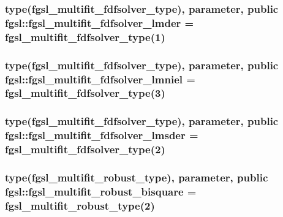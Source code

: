 \subsubsection[{fgsl\+\_\+multifit\+\_\+fdfsolver\+\_\+lmder}]{\setlength{\rightskip}{0pt plus 5cm}type({\bf fgsl\+\_\+multifit\+\_\+fdfsolver\+\_\+type}), parameter, public fgsl\+::fgsl\+\_\+multifit\+\_\+fdfsolver\+\_\+lmder = {\bf fgsl\+\_\+multifit\+\_\+fdfsolver\+\_\+type}(1)}\label{namespacefgsl_a8d1aeaeb6d1cc87ec0d79eddf44965b8}
\hypertarget{namespacefgsl_a144e01074d63149cca26a52ae3ee1ad0}{}
\subsubsection[{fgsl\+\_\+multifit\+\_\+fdfsolver\+\_\+lmniel}]{\setlength{\rightskip}{0pt plus 5cm}type({\bf fgsl\+\_\+multifit\+\_\+fdfsolver\+\_\+type}), parameter, public fgsl\+::fgsl\+\_\+multifit\+\_\+fdfsolver\+\_\+lmniel = {\bf fgsl\+\_\+multifit\+\_\+fdfsolver\+\_\+type}(3)}\label{namespacefgsl_a144e01074d63149cca26a52ae3ee1ad0}
\hypertarget{namespacefgsl_a24b9409272a5a9556e295c38502b6dbc}{}
\subsubsection[{fgsl\+\_\+multifit\+\_\+fdfsolver\+\_\+lmsder}]{\setlength{\rightskip}{0pt plus 5cm}type({\bf fgsl\+\_\+multifit\+\_\+fdfsolver\+\_\+type}), parameter, public fgsl\+::fgsl\+\_\+multifit\+\_\+fdfsolver\+\_\+lmsder = {\bf fgsl\+\_\+multifit\+\_\+fdfsolver\+\_\+type}(2)}\label{namespacefgsl_a24b9409272a5a9556e295c38502b6dbc}
\hypertarget{namespacefgsl_a36d1b09a0ed8ea4c5836ecc7e19e143a}{}
\subsubsection[{fgsl\+\_\+multifit\+\_\+robust\+\_\+bisquare}]{\setlength{\rightskip}{0pt plus 5cm}type({\bf fgsl\+\_\+multifit\+\_\+robust\+\_\+type}), parameter, public fgsl\+::fgsl\+\_\+multifit\+\_\+robust\+\_\+bisquare = {\bf fgsl\+\_\+multifit\+\_\+robust\+\_\+type}(2)}\label{namespacefgsl_a36d1b09a0ed8ea4c5836ecc7e19e143a}
\hypertarget{namespacefgsl_a106b8dc39c3609e38744526153f66d25}{}
